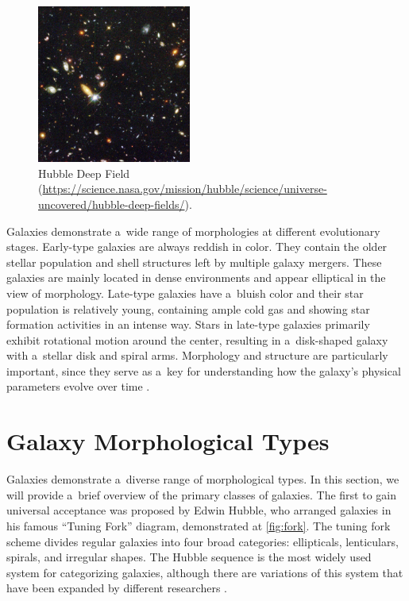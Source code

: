 \begin{figure}[htbp]
    \centering
    \includegraphics[width=0.45\textwidth]{obrazky-figures/02-theoretical-basis/deep-field.jpg}
    \caption{Hubble Deep Field (\url{https://science.nasa.gov/mission/hubble/science/universe-uncovered/hubble-deep-fields/}).}
    \label{fig:DeepFiled}
\end{figure}

Galaxies demonstrate a~wide range of morphologies at different evolutionary stages. Early-type galaxies are always reddish in color. They contain the older stellar population and shell structures left by multiple galaxy mergers. These galaxies are mainly located in dense environments and appear elliptical in the view of morphology. Late-type galaxies have a~bluish color and their star population is relatively young, containing ample cold gas and showing star formation activities in an intense way. Stars in late-type galaxies primarily exhibit rotational motion around the center, resulting in a~disk-shaped galaxy with a~stellar disk and spiral arms. Morphology and structure are particularly important, since they serve as a~key for understanding how the galaxy’s physical parameters evolve over time \cite{van1998galaxy}.

\section{Galaxy Morphological Types}

Galaxies demonstrate a~diverse range of morphological types. In this section, we will provide a~brief overview of the primary classes of galaxies. The first to gain universal acceptance was proposed by Edwin Hubble, who arranged galaxies in his famous “Tuning Fork” diagram, demonstrated at \autoref{fig:fork}. The tuning fork scheme divides regular galaxies into four broad categories: ellipticals, lenticulars, spirals, and irregular shapes. The Hubble sequence is the most widely used system for categorizing galaxies, although there are variations of this system that have been expanded by different researchers \cite{Bonham2022Galaxies}.

